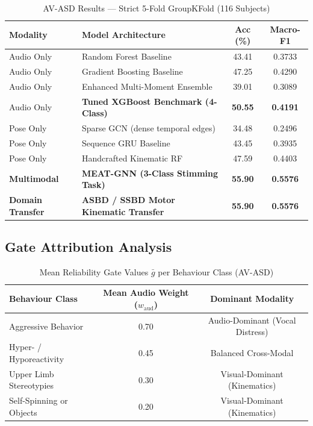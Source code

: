 \documentclass[conference]{IEEEtran}
\begin{document}
\begin{table}[h!]
\centering
\caption{AV-ASD Results — Strict 5-Fold GroupKFold (116 Subjects)}
\label{tab:avasd}
\begin{tabular}{llcc}
\toprule
\textbf{Modality} & \textbf{Model Architecture} & \textbf{Acc (\%)} & \textbf{Macro-F1} \\
\midrule
Audio Only & Random Forest Baseline & 43.41 & 0.3733 \\
Audio Only & Gradient Boosting Baseline & 47.25 & 0.4290 \\
Audio Only & Enhanced Multi-Moment Ensemble & 39.01 & 0.3089 \\
Audio Only & \textbf{Tuned XGBoost Benchmark (4-Class)} & \textbf{50.55} & \textbf{0.4191} \\
Pose Only & Sparse GCN (dense temporal edges) & 34.48 & 0.2496 \\
Pose Only & Sequence GRU Baseline & 43.45 & 0.3935 \\
Pose Only & Handcrafted Kinematic RF & 47.59 & 0.4403 \\
\midrule
\textbf{Multimodal} & \textbf{MEAT-GNN (3-Class Stimming Task)} & \textbf{55.90} & \textbf{0.5576} \\
\textbf{Domain Transfer} & \textbf{ASBD / SSBD Motor Kinematic Transfer} & \textbf{55.90} & \textbf{0.5576} \\
\bottomrule
\end{tabular}
\end{table}

\subsection{Gate Attribution Analysis}

\begin{table}[h!]
\centering
\caption{Mean Reliability Gate Values $\bar{g}$ per Behaviour Class (AV-ASD)}
\label{tab:gate}
\begin{tabular}{lcc}
\toprule
\textbf{Behaviour Class} & \textbf{Mean Audio Weight ($w_{\text{aud}}$)} & \textbf{Dominant Modality} \\
\midrule
Aggressive Behavior & 0.70 & Audio-Dominant (Vocal Distress) \\
Hyper- / Hyporeactivity & 0.45 & Balanced Cross-Modal \\
Upper Limb Stereotypies & 0.30 & Visual-Dominant (Kinematics) \\
Self-Spinning or Objects & 0.20 & Visual-Dominant (Kinematics) \\
\bottomrule
\end{tabular}
\end{table}
\end{document}

